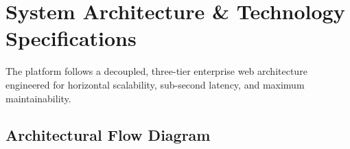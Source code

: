 \documentclass[10pt,a4paper]{article}
\begin{document}
\newpage

\section{System Architecture \& Technology Specifications}

The platform follows a decoupled, three-tier enterprise web architecture engineered for horizontal scalability, sub-second latency, and maximum maintainability.

\subsection{Architectural Flow Diagram}
\end{document}
